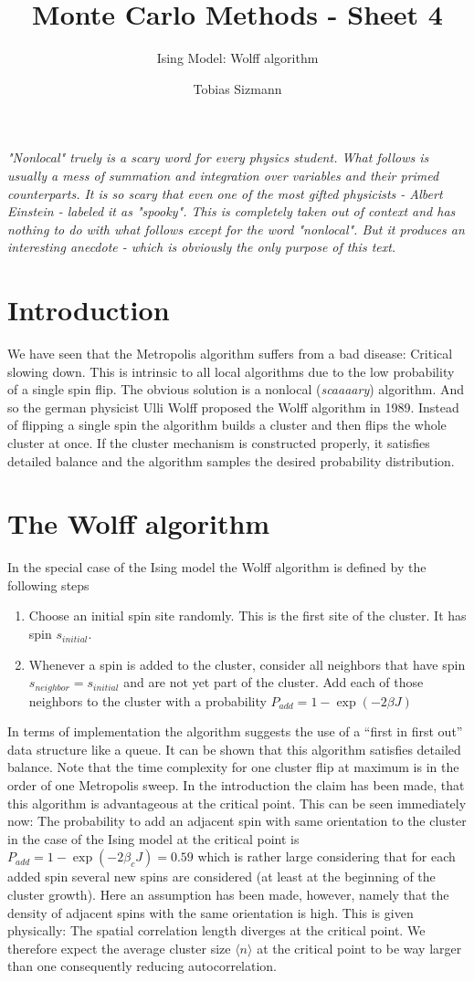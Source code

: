 \documentclass[11pt, a4paper]{scrartcl}
\title{Monte Carlo Methods - Sheet 4}
\subtitle{Ising Model: Wolff algorithm}
\author{Tobias Sizmann}
\begin{document}
\maketitle
\textit{"Nonlocal" truely is a scary word for every physics student. What follows is usually a mess of summation and integration over variables and their primed counterparts. It is so scary that even one of the most gifted physicists - Albert Einstein - labeled it as "spooky". This is completely taken out of context and has nothing to do with what follows except for the word "nonlocal". But it produces an interesting anecdote - which is obviously the only purpose of this text.}
\section{Introduction}
    We have seen that the Metropolis algorithm suffers from a bad disease: Critical slowing down. This is intrinsic to all local algorithms due to the low probability of a single spin flip. The obvious solution is a nonlocal (\textit{scaaaary}) algorithm. And so the german physicist Ulli Wolff proposed the Wolff algorithm in 1989. Instead of flipping a single spin the algorithm builds a cluster and then flips the whole cluster at once. If the cluster mechanism is constructed properly, it satisfies detailed balance and the algorithm samples the desired probability distribution.
\section{The Wolff algorithm}
    In the special case of the Ising model the Wolff algorithm is defined by the following steps
    \begin{enumerate}
        \item Choose an initial spin site randomly. This is the first site of the cluster. It has spin $s_{initial}$.
        \item Whenever a spin is added to the cluster, consider all neighbors that have spin $s_{neighbor} = s_{initial}$ and are not yet part of the cluster. Add each of those neighbors to the cluster with a probability $P_{add} = 1 - \exp(-2 \beta J)$
    \end{enumerate}
    In terms of implementation the algorithm suggests the use of a ``first in first out'' data structure like a queue. It can be shown that this algorithm satisfies detailed balance. Note that the time complexity for one cluster flip at maximum is in the order of one Metropolis sweep. In the introduction the claim has been made, that this algorithm is advantageous at the critical point. This can be seen immediately now: The probability to add an adjacent spin with same orientation to the cluster in the case of the Ising model at the critical point is $P_{add} = 1 - \exp(-2 \beta_c J) = 0.59$ which is rather large considering that for each added spin several new spins are considered (at least at the beginning of the cluster growth). Here an assumption has been made, however, namely that the density of adjacent spins with the same orientation is high. This is given physically: The spatial correlation length diverges at the critical point. We therefore expect the average cluster size $\langle n \rangle$ at the critical point to be way larger than one consequently reducing autocorrelation.
\end{document}
